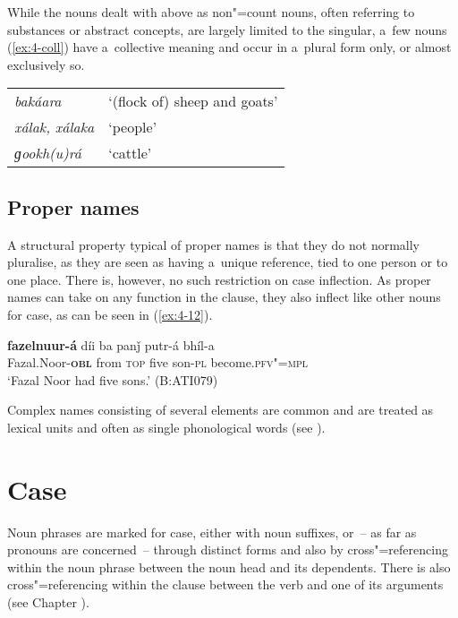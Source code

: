 While the nouns dealt with above as non"=count nouns, often referring to substances or abstract concepts, are largely limited to the singular, a~few nouns (\ref{ex:4-coll}) have a~collective meaning and occur in a~plural form only, or almost exclusively so.


\begin{exe}
\extab
\label{ex:4-coll}
\begin{tabularx}{\textwidth}{ l@{\hspace{40pt}} Q }
\textit{bakáara} &
`(flock of) sheep and goats'\\
\textit{xálak, xálaka} &
`people'\\
\textit{ɡookh(u)rá} &
`cattle'\\
\end{tabularx}
\end{exe}

\subsection{Proper names}
\label{subsec:4-4-3}

A structural property typical of proper names is that they do not normally pluralise, as they are seen as having a~unique reference, tied to one person or to one place. There is, however, no such restriction on case inflection. As proper names can take on any function in the clause, they also inflect like other nouns for case, as can be seen in (\ref{ex:4-12}).

\begin{exe}
\ex
\label{ex:4-12}
\gll \textbf{fazelnuur-á} díi ba panǰ putr-á bhíl-a \\
	Fazal.Noor-\textbf{\textsc{obl}} from \textsc{top} five son-\textsc{pl} become.\textsc{pfv"=mpl} \\
\glt `Fazal Noor had five sons.' (B:ATI079)
\end{exe}

Complex names consisting of several elements are common and are treated as lexical units and often as single phonological words (see ).

\section{Case}
\label{sec:4-5}

Noun phrases are marked for case, either with noun suffixes, or~-- as far as pronouns are concerned~-- through distinct forms and also by cross"=referencing within the noun phrase between the noun head and its dependents. There is also cross"=referencing within the clause between the verb and one of its arguments (see Chapter ).



